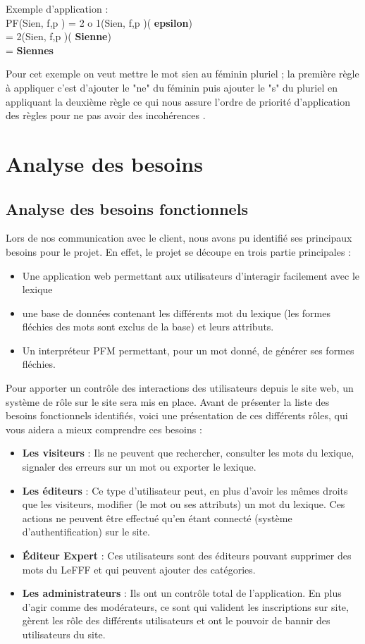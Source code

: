\documentclass[12pt,a4paper]{article}
\begin{document}
Exemple d'application : \\
PF(Sien, {f,p} ) = 2 o 1(Sien, {f,p} )(\textbf{ epsilon}) \\
                 = 2(Sien, {f,p} )(\textbf{ Sienne}) \\
                 =\textbf{ Siennes }

Pour cet exemple on veut mettre le mot sien au féminin pluriel ; la première règle à appliquer c'est d'ajouter le "ne" du féminin puis ajouter le "s" du pluriel en appliquant la deuxième règle ce qui nous assure l'ordre de priorité d'application des règles pour ne pas avoir des incohérences .

\section{Analyse des besoins}
\subsection{Analyse des besoins fonctionnels}
\smallbreak Lors de nos communication avec le client, nous avons pu identifié ses principaux besoins pour le projet. En effet, le projet se découpe en trois partie principales : 
\begin{itemize}  
  \item Une application web permettant aux utilisateurs d'interagir facilement avec le lexique
  \item une base de données contenant les différents mot du lexique (les formes fléchies des mots sont exclus de la base) et leurs attributs.
  \item Un interpréteur PFM permettant, pour un mot donné, de générer ses formes fléchies.
\end{itemize}

\smallbreak Pour apporter un contrôle des interactions des utilisateurs depuis le site web, un système de rôle sur le site sera mis en place. Avant de présenter la liste des besoins fonctionnels identifiés, voici une présentation de ces différents rôles, qui vous aidera a mieux comprendre ces besoins : 
\begin{itemize}  
  \item \textbf{Les visiteurs} : Ils ne peuvent que rechercher, consulter les mots du lexique, signaler des erreurs sur un mot ou exporter le lexique.
  \item \textbf{Les éditeurs} : Ce type d'utilisateur peut, en plus d'avoir les mêmes droits que les visiteurs, modifier (le mot ou ses attributs) un mot du lexique. Ces actions ne peuvent être effectué qu'en étant connecté (système d'authentification) sur le site.
  \item \textbf{Éditeur Expert} :  Ces utilisateurs sont des éditeurs pouvant supprimer des mots du LeFFF et qui peuvent ajouter des catégories.
  \item \textbf{Les administrateurs} : Ils ont un contrôle total de l'application. En plus d'agir comme des modérateurs, ce sont qui valident les inscriptions sur site, gèrent les rôle des différents utilisateurs et ont le pouvoir de bannir des utilisateurs du site.
\end{itemize}
\end{document}
